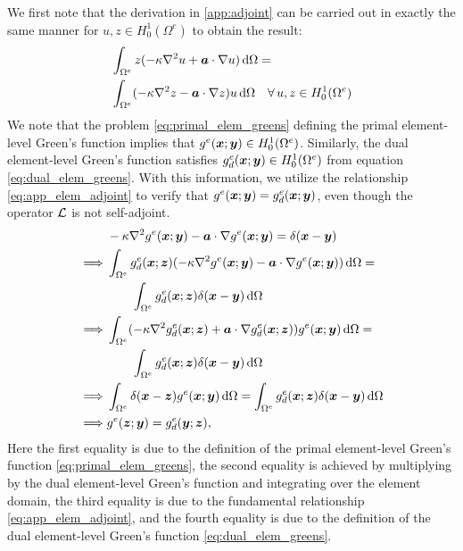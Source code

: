 We first note that
the derivation in \ref{app:adjoint} can
be carried out in exactly the same manner
for $u,z \in H^1_0(\Omega^e)$ to obtain the result:
%
\begin{gather}
\begin{aligned}
&\int_{\Omega^e} z(-\kappa \nabla^2 {u} + \boldsymbol{a} \cdot \nabla {u}) \, \text{d} \Omega = \\
&\int_{\Omega^e} (-\kappa \nabla^2 {z} - \boldsymbol{a} \cdot \nabla {z}) u \, \text{d} \Omega
\quad \forall \, u,z \in H^1_0(\Omega^e)
\end{aligned}
\label{eq:app_elem_adjoint}
\end{gather}
%
We note that the problem \eqref{eq:primal_elem_greens}
defining the primal element-level Green's function implies that
$g^e(\boldsymbol{x}; \boldsymbol{y}) \in H^1_0(\Omega^e)$.
Similarly, the dual element-level Green's function satisfies
$g^e_d(\boldsymbol{x}; \boldsymbol{y}) \in H^1_0(\Omega^e)$ from equation
\eqref{eq:dual_elem_greens}. With this information,
we utilize the relationship \eqref{eq:app_elem_adjoint} to verify
that $g^e(\boldsymbol{x}; \boldsymbol{y}) = g^e_d(\boldsymbol{x}; \boldsymbol{y})$, even though
the operator $\mathcal{L}$ is not self-adjoint.
%
\begin{gather*}
\begin{aligned}
&-\kappa \nabla^2 { g^e(\boldsymbol{x}; \boldsymbol{y}) } - \boldsymbol{a} \cdot \nabla { g^e(\boldsymbol{x}; \boldsymbol{y}) }
=
\delta(\boldsymbol{x} - \boldsymbol{y}) \\
\implies &\int_{\Omega^e}
g^e_d(\boldsymbol{x}; \boldsymbol{z}) (-\kappa \nabla^2 { g^e(\boldsymbol{x}; \boldsymbol{y}) } - \boldsymbol{a} \cdot \nabla { g^e(\boldsymbol{x}; \boldsymbol{y}) })
\, \text{d} \Omega
= \\
& \quad \quad \int_{\Omega^e}
g^e_d(\boldsymbol{x}; \boldsymbol{z}) \delta(\boldsymbol{x} - \boldsymbol{y})
\, \text{d} \Omega \\
\implies
& \int_{\Omega^e} (-\kappa \nabla^2 { g^e_d(\boldsymbol{x}; \boldsymbol{z})} + \boldsymbol{a} \cdot \nabla { g^e_d(\boldsymbol{x}; \boldsymbol{z})}) g^e(\boldsymbol{x}; \boldsymbol{y})
\, \text{d} \Omega
= \\
& \quad \quad \int_{\Omega^e}
g^e_d(\boldsymbol{x}; \boldsymbol{z}) \delta(\boldsymbol{x} - \boldsymbol{y})
\, \text{d} \Omega \\
\implies
& \int_{\Omega^e} \delta(\boldsymbol{x} - \boldsymbol{z}) g^e(\boldsymbol{x}; \boldsymbol{y})
\, \text{d} \Omega
=
\int_{\Omega^e}
g^e_d(\boldsymbol{x}; \boldsymbol{z}) \delta(\boldsymbol{x} - \boldsymbol{y})
\, \text{d} \Omega \\
\implies
& g^e(\boldsymbol{z}; \boldsymbol{y})
= g^e_d(\boldsymbol{y}; \boldsymbol{z}),
\end{aligned}
\end{gather*}
%
Here the first equality is due to the definition of the
primal element-level Green's function \eqref{eq:primal_elem_greens},
the second equality is achieved by multiplying by the dual
element-level Green's function and integrating over the element domain,
the third equality is due to the fundamental relationship
\eqref{eq:app_elem_adjoint}, and the fourth equality is due to the
definition of the dual element-level Green's function
\eqref{eq:dual_elem_greens}.
